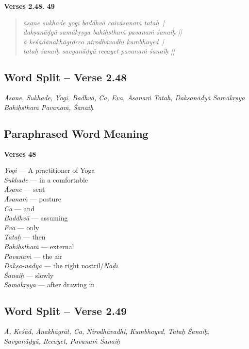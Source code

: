 \noindent \textbf{Verses 2.48. 49}

\begin{verse}
\textit{āsane sukhade yogī baddhvā caivāsanaṁ tataḥ |\\
dakṣanāḍyā samākṛṣya bahiḥsthaṁ pavanaṁ śanaiḥ ||\\
ā keśādānakhāgrācca nirodhāvadhi kumbhayed |\\
tataḥ śanaiḥ savyanāḍyā recayet pavanaṁ śanaiḥ ||}
\end{verse}

\subsection*{Word Split -- Verse 2.48}

\textit{Āsane, Sukhade, Yogi, Badhvā, Ca, Eva, Āsanaṁ Tataḥ, Dakṣanāḍyā Samākṛṣya Bahiḥsthaṁ Pavanaṁ, Śanaiḥ}

\subsection*{Paraphrased Word Meaning}


\noindent \textbf{Verses 48}

\begin{multicols}{2}
\textit{Yogi} --- A practitioner of Yoga \\
\textit{Sukhade} --- in a comfortable \\
\textit{Āsane} --- seat \\
\textit{Āsanaṁ} --- posture  \\
\textit{Ca} --- and \\
\textit{Baddhvā} --- assuming\\
\textit{Eva} --- only\\
\textit{Tataḥ} --- then\\ 
\textit{Bahiḥsthaṁ} --- external\\
\textit{Pavanaṁ} --- the air \\
\textit{Dakṣa-nāḍyā} --- the right nostril/\textit{Nāḍī}\\
\textit{Śanaiḥ} --- slowly \\
\textit{Samākṛṣya} --- after drawing in
\end{multicols}

\subsection*{Word Split – Verse 2.49}

\textit{Ā, Keśād, Ānakhāgrāt, Ca, Nirodhāvadhi, Kumbhayed, Tataḥ Śanaiḥ, Savyanāḍyā, Recayet, Pavanaṁ Śanaiḥ}

